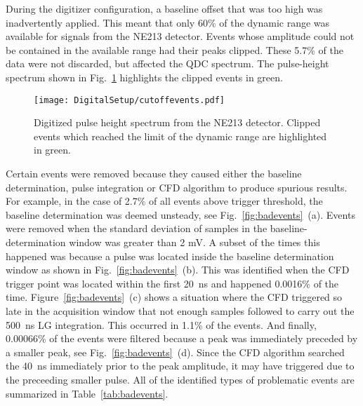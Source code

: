 \documentclass[main.tex]{subfiles}
\begin{document}
During the digitizer configuration, a baseline offset that was too high was inadvertently applied. This meant that only 60\% of the dynamic range was available for signals from the NE213 detector. Events whose amplitude could not be contained in the available range had their peaks clipped. These 5.7\% of the data were not discarded, but affected the QDC spectrum. The pulse-height spectrum shown in Fig.~\ref{fig:cutoffevents} highlights the clipped events in green.
\begin{figure}[hb!]
    \centering
        \texttt{[image: DigitalSetup/cutoffevents.pdf]}
        \caption[Digitized pulse-height spectrum]{Digitized pulse height spectrum from the NE213 detector. Clipped events which reached the limit of the dynamic range are highlighted in green.}
    \label{fig:cutoffevents} 
\end{figure}

Certain events were removed because they caused either the baseline determination, pulse integration or CFD algorithm to produce spurious results. For example, in the case of 2.7\% of all events above trigger threshold, the baseline determination was deemed unsteady, see Fig.~\ref{fig:badevents}~(a). Events were removed when the standard deviation of samples in the baseline-determination window was greater than 2 mV. A subset of the times this happened was because a pulse was located inside the baseline determination window as shown in Fig.~\ref{fig:badevents}~(b). This was identified when the CFD trigger point was located within the first \SI{20}{ns} and happened 0.0016\% of the time. Figure~\ref{fig:badevents}~(c) shows a situation where the CFD triggered so late in the acquisition window that not enough samples followed to carry out the \SI{500}{\nano\second} LG integration. This occurred in 1.1\% of the events. And finally, 0.00066\% of the events were filtered because a peak was immediately  preceded by a smaller peak, see Fig.~\ref{fig:badevents}~(d). Since the CFD algorithm searched the \SI{40}{ns} immediately prior to the peak amplitude, it may have triggered due to the preceeding smaller pulse. All of the identified types of problematic events are summarized in Table~\ref{tab:badevents}.
\end{document}
